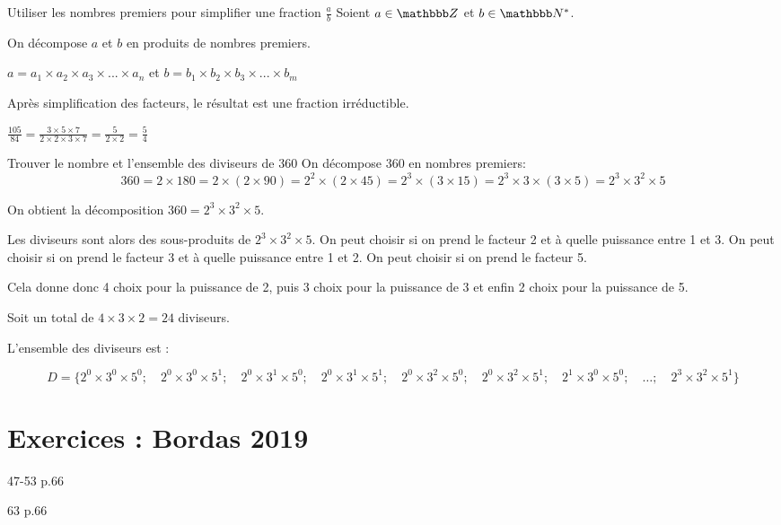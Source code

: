 \documentclass[10pt,a4paper,openany,twoside,prof]{book}
\begin{document}
\begin{methode}{Utiliser les nombres premiers pour simplifier une fraction $\frac{a}{b}$}{}
   Soient $a\in\Z$ et $b\in\N^*$.

   On décompose $a$ et $b$ en produits de nombres premiers.

   $a = a_1\times a_2\times a_3\times ... \times a_n$ et
   $b = b_1\times b_2\times b_3\times ... \times b_m$

   Après simplification des facteurs, le résultat est une fraction irréductible.
\end{methode}

\begin{ex}{}{}
  $\frac{105}{84} = \frac{3\times 5 \times 7}{2\times 2 \times 3 \times 7} = \frac{5 }{2\times 2} = \frac{5}{4}$
\end{ex}

\begin{ex}{Trouver le nombre et l'ensemble des diviseurs de 360}{}
  On décompose $360$ en nombres premiers:
  $$360=2\times180=2\times(2\times90)=2^2\times(2\times45)=2^3\times(3\times15)=2^3\times3\times(3\times5) = 2^3\times3^2\times5$$

  On obtient la décomposition $360=2^3\times3^2\times5$.

Les diviseurs sont alors des sous-produits de $2^3\times3^2\times5$. On peut choisir si on prend le facteur 2 et à quelle puissance entre 1 et 3. On peut choisir si on prend le facteur 3 et à quelle puissance entre 1 et 2. On peut choisir si on prend le facteur 5.

\medskip
Cela donne donc 4 choix pour la puissance de 2, puis 3 choix pour la puissance de 3 et enfin 2 choix pour la puissance de 5.

Soit un total de $4\times3\times2 = 24$ diviseurs.

L'ensemble des diviseurs est :

$$D = \{2^0\times3^0\times5^0;\quad 2^0\times3^0\times5^1;\quad 2^0\times3^1\times5^0;\quad 2^0\times3^1\times5^1;\quad 2^0\times3^2\times5^0;\quad 2^0\times3^2\times5^1;\quad 2^1\times3^0\times5^0;\quad \dots;\quad 2^3\times3^2\times5^1\}$$
\end{ex}

\newpage
\section*{Exercices : Bordas 2019}
\begin{bookexos}{47-53 p.66}\end{bookexos}
\begin{bookexo}{63 p.66}\end{bookexo}
\end{document}
